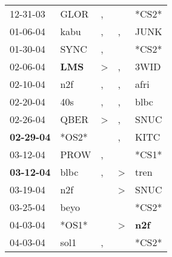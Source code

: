 \begin{supertabular}{p{0.07\textwidth}p{0.06\textwidth}p{0.02\textwidth}p{0.02\textwidth}p{0.06\textwidth}}
          12-31-03\textsuperscript{} &           GLOR\textsuperscript{} &                , &                  &                            *CS2* \\
          01-06-04\textsuperscript{} &           kabu\textsuperscript{} &                , &                , &           JUNK\textsuperscript{} \\
          01-30-04\textsuperscript{} &           SYNC\textsuperscript{} &                , &                  &                            *CS2* \\
          02-06-04\textsuperscript{} &   \textbf{LMS\textsuperscript{}} &     \textgreater &                , &           3WID\textsuperscript{} \\
          02-10-04\textsuperscript{} &            n2f\textsuperscript{} &                , &                , &           afri\textsuperscript{} \\
          02-20-04\textsuperscript{} &            40s\textsuperscript{} &                , &                , &           blbc\textsuperscript{} \\
          02-26-04\textsuperscript{} &           QBER\textsuperscript{} &     \textgreater &                , &           SNUC\textsuperscript{} \\
 \textbf{02-29-04\textsuperscript{}} &                            *OS2* &                  &                , &           KITC\textsuperscript{} \\
          03-12-04\textsuperscript{} &           PROW\textsuperscript{} &                , &                  &                            *CS1* \\
 \textbf{03-12-04\textsuperscript{}} &           blbc\textsuperscript{} &                , &     \textgreater &           tren\textsuperscript{} \\
          03-19-04\textsuperscript{} &            n2f\textsuperscript{} &                  &     \textgreater &           SNUC\textsuperscript{} \\
          03-25-04\textsuperscript{} &           beyo\textsuperscript{} &                  &                  &                            *CS2* \\
          04-03-04\textsuperscript{} &                            *OS1* &                  &     \textgreater &   \textbf{n2f\textsuperscript{}} \\
          04-03-04\textsuperscript{} &           sol1\textsuperscript{} &                , &                  &                            *CS2* \\

\end{supertabular}
